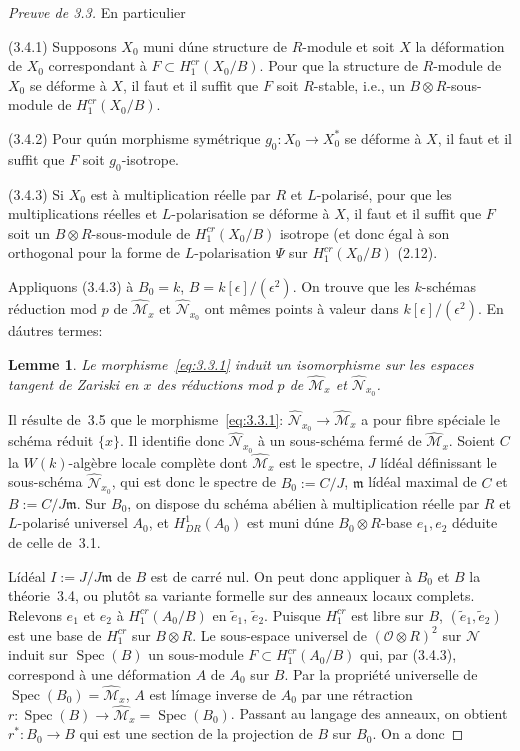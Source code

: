 \documentclass[11pt,a4paper]{article}
\theoremstyle{plain}
\newtheorem{lemma}[theorem]{Lemme}
\theoremstyle{definition}
\DeclareMathOperator{\Spec}{Spec}
\begin{document}
\begin{proof}[Preuve de 3.3]
En particulier

(3.4.1) Supposons $X_0$ muni d\'une structure de $R$-module et soit $X$ la d\'eformation de $X_0$ correspondant \`a $F \subset H^{cr}_1(X_0/B)$. Pour que la structure de $R$-module
de $X_0$ se d\'eforme \`a $X$, il faut et il suffit que $F$ soit $R$-stable, i.e., un
$B \otimes R$-sous-module de $H^{cr}_1(X_0/B)$.

(3.4.2) Pour qu\'un morphisme sym\'etrique $g_0: X_0 \to X_0^*$ se d\'eforme \`a $X$, il faut
et il suffit que $F$ soit $g_0$-isotrope.

(3.4.3) Si $X_0$ est \`a multiplication r\'eelle par $R$ et $L$-polaris\'e, pour que les
multiplications r\'eelles et $L$-polarisation se d\'eforme \`a $X$, il faut et il suffit que
$F$ soit un $B \otimes R$-sous-module de $H^{cr}_1(X_0/B)$ isotrope (et donc \'egal \`a son
orthogonal pour la forme de $L$-polarisation $\Psi$ sur $H^{cr}_1(X_0/B)$ (2.12).

Appliquons (3.4.3) \`a $B_0 = k$, $B = k[\epsilon]/(\epsilon^2)$. On trouve que les $k$-sch\'emas
r\'eduction mod $p$ de $\hat{\mathscr{M}}_x$ et $\hat{\mathscr{N}}_{x_0}$ ont m\^emes points \`a valeur dans $k[\epsilon]/(\epsilon^2)$. En
d\'autres termes:

\begin{lemma}
Le morphisme~\eqref{eq:3.3.1} induit un isomorphisme sur les espaces
tangent de Zariski en $x$ des r\'eductions mod $p$ de $\hat{\mathscr{M}}_x$ et $\hat{\mathscr{N}}_{x_0}$.
\end{lemma}

Il r\'esulte de~3.5 que le morphisme~\eqref{eq:3.3.1}: $\hat{\mathscr{N}}_{x_0} \to \hat{\mathscr{M}}_x$ a pour fibre sp\'eciale le
sch\'ema r\'eduit $\{x\}$. Il identifie donc $\hat{\mathscr{N}}_{x_0}$ \`a un sous-sch\'ema ferm\'e de $\hat{\mathscr{M}}_x$. Soient
$C$ la $W(k)$-alg\`ebre locale compl\`ete dont $\hat{\mathscr{M}}_x$ est le spectre, $J$ l\'id\'eal d\'efinissant
le sous-sch\'ema $\hat{\mathscr{N}}_{x_0}$, qui est donc le spectre de $B_0 := C/J$, $\mathfrak{m}$ l\'id\'eal maximal de
$C$ et $B := C/J\mathfrak{m}$. Sur $B_0$, on dispose du sch\'ema ab\'elien \`a multiplication r\'eelle
par $R$ et $L$-polaris\'e universel $A_0$, et $H^1_{DR}(A_0)$ est muni d\'une $B_0 \otimes R$-base $e_1, e_2$
d\'eduite de celle de~3.1.

L\'id\'eal $I := J/J\mathfrak{m}$ de $B$ est de carr\'e nul. On peut donc appliquer \`a $B_0$ et $B$ la
th\'eorie~3.4, ou plut\^ot sa variante formelle sur des anneaux locaux complets.
Relevons $e_1$ et $e_2$ \`a $H^{cr}_1(A_0/B)$ en $\tilde{e}_1$, $\tilde{e}_2$. Puisque $H^{cr}_1$ est libre sur $B$, $(\tilde{e}_1, \tilde{e}_2)$
est une base de $H^{cr}_1$ sur $B \otimes R$. Le sous-espace universel de $(\mathscr{O} \otimes R)^2$ sur $\mathscr{N}$
induit sur $\Spec(B)$ un sous-module $F \subset H^{cr}_1(A_0/B)$ qui, par (3.4.3), correspond
\`a une d\'eformation $A$ de $A_0$ sur $B$. Par la propri\'et\'e universelle de
$\Spec(B_0) = \hat{\mathscr{M}}_x$, $A$ est l\'image inverse de $A_0$ par une r\'etraction
$r: \Spec(B) \to \hat{\mathscr{M}}_x = \Spec(B_0)$. Passant au langage des anneaux, on obtient
$r^*: B_0 \to B$ qui est une section de la projection de $B$ sur $B_0$. On a donc


\end{proof}
\end{document}
